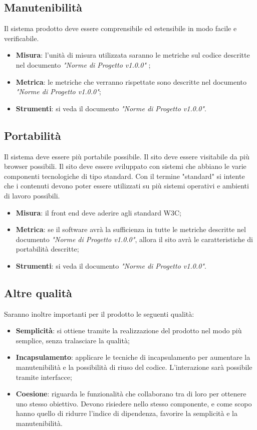 \documentclass[12pt,a4paper,titlepage]{article}
\begin{document}
		\subsection{Manutenibilità}
		Il sistema prodotto deve essere comprensibile ed estensibile in modo facile e verificabile.
		\begin{itemize}
			\item \textbf{Misura}: l'unità di misura utilizzata saranno le metriche sul codice descritte nel documento \textit{"Norme di Progetto v1.0.0"} ;
			\item \textbf{Metrica}: le metriche che verranno rispettate sono descritte nel documento \textit{"Norme di Progetto v1.0.0"};
			\item \textbf{Strumenti}: si veda il documento \textit{"Norme di Progetto v1.0.0"}.
		\end{itemize}
	
		\subsection{Portabilità}
		Il sistema deve essere più portabile possibile. Il sito deve essere visitabile da più browser possibili. Il sito deve essere sviluppato con sistemi che abbiano le varie componenti tecnologiche di tipo standard. Con il termine "standard" si intente che i contenuti devono poter essere utilizzati su più sistemi operativi e ambienti di lavoro possibili.
			\begin{itemize}
				\item \textbf{Misura}: il front end deve aderire agli standard W3C;
				\item \textbf{Metrica}: se il software avrà la sufficienza in tutte le metriche descritte nel documento \textit{"Norme di Progetto v1.0.0"}, allora il sito avrà le caratteristiche di portabilità descritte;
				\item \textbf{Strumenti}: si veda il documento \textit{"Norme di Progetto v1.0.0"}.
			\end{itemize}
		
		\subsection{Altre qualità}
		Saranno inoltre importanti per il prodotto le seguenti qualità:
		\begin{itemize}
			\item \textbf{Semplicità}: si ottiene tramite la realizzazione del prodotto nel modo più semplice, senza tralasciare la qualità;
			\item \textbf{Incapsulamento}: applicare le tecniche di incapsulamento per aumentare la manutenibilità e la possibilità di riuso del codice. L'interazione sarà possibile tramite interfacce;
			\item \textbf{Coesione}: riguarda le funzionalità che collaborano tra di loro per ottenere uno stesso obiettivo. Devono risiedere nello stesso componente, e come scopo hanno quello di ridurre l'indice di dipendenza, favorire la semplicità e la manutenibilità.
		\end{itemize}
	
\end{document}
